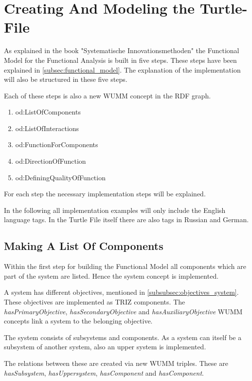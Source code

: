 \section{Creating And Modeling the Turtle-File}
\label{sec:turtle_file}

As explained in the book "Systematische Innovationsmethoden" the Functional Model for the Functional Analysis is built in five steps.
These steps have been explained in \ref{subsec:functional_model}.
The explanation of the implementation will also be structured in these five steps.

Each of these steps is also a new WUMM concept in the RDF graph. 

\begin{enumerate}[noitemsep]
    \item od:ListOfComponents
    \item od:ListOfInteractions
    \item od:FunctionForComponents
    \item od:DirectionOfFunction
    \item od:DefiningQualityOfFunction
\end{enumerate}

For each step the necessary implementation steps will be explained. 

In the following all implementation examples will only include the English language tags.
In the Turtle File itself there are also tags in Russian and German.


\subsection{Making A List Of Components}

Within the first step for building the Functional Model all components which are part of the system are listed.
Hence the system concept is implemented.

A system has different objectives, mentioned in \ref{subsubsec:objectives_system}. 
These objectives are implemented as TRIZ components. 
The \textit{hasPrimaryObjective}, \textit{hasSecondaryObjective} and \textit{hasAuxiliaryObjective} WUMM concepts link a system to the belonging objective.

The system consists of subsystems and components. 
As a system can itself be a subsystem of another system, also an upper system is implemented. 

The relations between these are created via new WUMM triples.
These are \textit{hasSubsystem}, \textit{hasUppersystem}, \textit{hasComponent} and \textit{hasComponent}.

